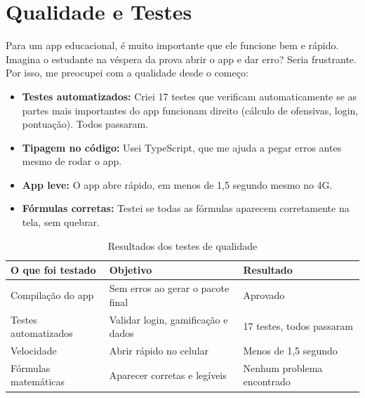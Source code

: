 \documentclass[12pt, a4paper]{article}
\begin{document}
\section{Qualidade e Testes}

Para um app educacional, \'{e} muito importante que ele funcione bem e r\'{a}pido. Imagina o estudante na v\'{e}spera da prova abrir o app e dar erro? Seria frustrante. Por isso, me preocupei com a qualidade desde o come\c{c}o:

\begin{itemize}[leftmargin=2cm]
  \item \textbf{Testes automatizados:} Criei 17 testes que verificam automaticamente se as partes mais importantes do app funcionam direito (c\'{a}lculo de ofensivas, login, pontua\c{c}\~{a}o). Todos passaram.
  \item \textbf{Tipagem no c\'{o}digo:} Usei TypeScript, que me ajuda a pegar erros antes mesmo de rodar o app.
  \item \textbf{App leve:} O app abre r\'{a}pido, em menos de 1,5 segundo mesmo no 4G.
  \item \textbf{F\'{o}rmulas corretas:} Testei se todas as f\'{o}rmulas aparecem corretamente na tela, sem quebrar.
\end{itemize}

\begin{table}[H]
\centering
\caption{Resultados dos testes de qualidade}
\begin{tabularx}{\textwidth}{l X l}
\toprule
\textbf{O que foi testado} & \textbf{Objetivo} & \textbf{Resultado} \\
\midrule
Compila\c{c}\~{a}o do app & Sem erros ao gerar o pacote final & Aprovado \\
Testes automatizados & Validar login, gamifica\c{c}\~{a}o e dados & 17 testes, todos passaram \\
Velocidade & Abrir r\'{a}pido no celular & Menos de 1,5 segundo \\
F\'{o}rmulas matem\'{a}ticas & Aparecer corretas e leg\'{i}veis & Nenhum problema encontrado \\
\bottomrule
\end{tabularx}
\end{table}

\end{document}
